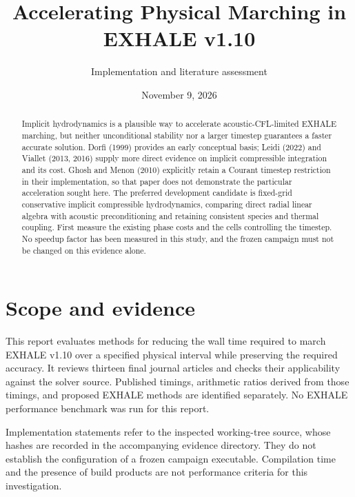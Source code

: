 \documentclass[english,a4paper]{my_memo}
\title{Accelerating Physical Marching in EXHALE v1.10}
\author{Implementation and literature assessment}
\date{November 9, 2026}
\begin{document}
\maketitle
\begin{abstract}
Implicit hydrodynamics is a plausible way to accelerate acoustic-CFL-limited EXHALE marching, but neither unconditional stability nor a larger timestep guarantees a faster accurate solution. Dorfi (1999) provides an early conceptual basis; Leidi (2022) and Viallet (2013, 2016) supply more direct evidence on implicit compressible integration and its cost. Ghosh and Menon (2010) explicitly retain a Courant timestep restriction in their implementation, so that paper does not demonstrate the particular acceleration sought here. The preferred development candidate is fixed-grid conservative implicit compressible hydrodynamics, comparing direct radial linear algebra with acoustic preconditioning and retaining consistent species and thermal coupling. First measure the existing phase costs and the cells controlling the timestep. No speedup factor has been measured in this study, and the frozen campaign must not be changed on this evidence alone.
\end{abstract}

\section{Scope and evidence}
This report evaluates methods for reducing the wall time required to march EXHALE v1.10 over a specified physical interval while preserving the required accuracy. It reviews thirteen final journal articles and checks their applicability against the solver source. Published timings, arithmetic ratios derived from those timings, and proposed EXHALE methods are identified separately. No EXHALE performance benchmark was run for this report.

Implementation statements refer to the inspected working-tree source, whose hashes are recorded in the accompanying evidence directory. They do not establish the configuration of a frozen campaign executable. Compilation time and the presence of build products are not performance criteria for this investigation.
\end{document}
